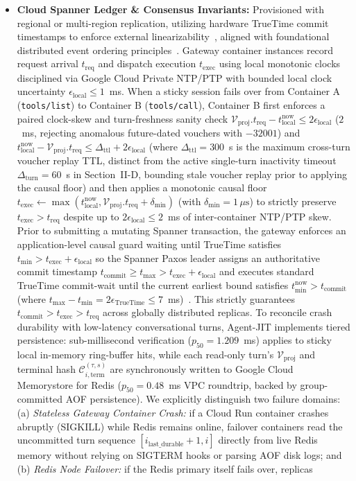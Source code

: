 \documentclass[conference,10pt]{IEEEtran}
\begin{document}
\begin{itemize}
    \item \textbf{Cloud Spanner Ledger \& Consensus Invariants:} Provisioned with regional or multi-region replication, utilizing hardware TrueTime commit timestamps to enforce external linearizability~\cite{corbett2013spanner}, aligned with foundational distributed event ordering principles~\cite{lamport1978time}. Gateway container instances record request arrival $t_{\text{req}}$ and dispatch execution $t_{\text{exec}}$ using local monotonic clocks disciplined via Google Cloud Private NTP/PTP with bounded local clock uncertainty $\epsilon_{\text{local}} \le 1$~ms. When a sticky session fails over from Container A (\texttt{tools/list}) to Container B (\texttt{tools/call}), Container B first enforces a paired clock-skew and turn-freshness sanity check $\mathcal{V}_{\text{proj}}.t_{\text{req}} - t_{\text{local}}^{\text{now}} \le 2\epsilon_{\text{local}}$ ($2$~ms, rejecting anomalous future-dated vouchers with $-32001$) and $t_{\text{local}}^{\text{now}} - \mathcal{V}_{\text{proj}}.t_{\text{req}} \le \Delta_{\text{ttl}} + 2\epsilon_{\text{local}}$ (where $\Delta_{\text{ttl}} = 300$~s is the maximum cross-turn voucher replay TTL, distinct from the active single-turn inactivity timeout $\Delta_{\text{turn}} = 60$~s in Section~II-D, bounding stale voucher replay prior to applying the causal floor) and then applies a monotonic causal floor $t_{\text{exec}} \leftarrow \max(t_{\text{local}}^{\text{now}}, \mathcal{V}_{\text{proj}}.t_{\text{req}} + \delta_{\min})$ (with $\delta_{\min} = 1\,\mu\text{s}$) to strictly preserve $t_{\text{exec}} > t_{\text{req}}$ despite up to $2\epsilon_{\text{local}} \le 2$~ms of inter-container NTP/PTP skew. Prior to submitting a mutating Spanner transaction, the gateway enforces an application-level causal guard waiting until TrueTime satisfies $t_{\min} > t_{\text{exec}} + \epsilon_{\text{local}}$ so the Spanner Paxos leader assigns an authoritative commit timestamp $t_{\text{commit}} \ge t_{\max} > t_{\text{exec}} + \epsilon_{\text{local}}$ and executes standard TrueTime commit-wait until the current earliest bound satisfies $t_{\min}^{\text{now}} > t_{\text{commit}}$ (where $t_{\max} - t_{\min} = 2\epsilon_{\text{TrueTime}} \le 7$~ms)~\cite{corbett2013spanner}. This strictly guarantees $t_{\text{commit}} > t_{\text{exec}} > t_{\text{req}}$ across globally distributed replicas. To reconcile crash durability with low-latency conversational turns, Agent-JIT implements tiered persistence: sub-millisecond verification ($p_{50} = 1.209$~ms) applies to sticky local in-memory ring-buffer hits, while each read-only turn's $\mathcal{V}_{\text{proj}}$ and terminal hash $\mathcal{C}_{i,\text{term}}^{(\tau,s)}$ are synchronously written to Google Cloud Memorystore for Redis ($p_{50} = 0.48$~ms VPC roundtrip, backed by group-committed AOF persistence). We explicitly distinguish two failure domains: (a) \emph{Stateless Gateway Container Crash:} if a Cloud Run container crashes abruptly (SIGKILL) while Redis remains online, failover containers read the uncommitted turn sequence $[i_{\text{last\_durable}} + 1, i]$ directly from live Redis memory without relying on SIGTERM hooks or parsing AOF disk logs; and (b) \emph{Redis Node Failover:} if the Redis primary itself fails over, replicas 
\end{itemize}
\end{document}
